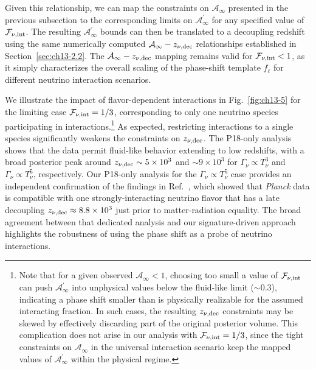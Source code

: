 Given this relationship, we can map the constraints on $\mathcal{A}_{\infty}$ presented in the previous subsection to the corresponding limits on $\mathcal{A}^\prime_{\infty}$ for any specified value of $\mathcal{F}_{\nu,\rm int}$. The resulting $\mathcal{A}^\prime_{\infty}$ bounds can then be translated to a decoupling redshift using the same numerically computed $\mathcal{A}_\infty - z_{\nu,\rm dec}$ relationships established in Section~\ref{sec:ch13-2.2}. The $\mathcal{A}_\infty - z_{\nu,\rm dec}$ mapping remains valid for $\mathcal{F}_{\nu,\rm int} < 1$, as it simply characterizes the overall scaling of the phase-shift template $f_\ell$ for different neutrino interaction scenarios.

We illustrate the impact of flavor-dependent interactions in Fig.~\ref{fig:ch13-5} for the limiting case $\mathcal{F}_{\nu,\rm int} = 1/3$, corresponding to only one neutrino species participating in interactions.\footnote{Note that for a given observed $\mathcal{A}_\infty<1$, choosing too small a value of $\mathcal{F}_{\nu,\rm int}$ can push $\mathcal{A}^\prime_\infty$ into unphysical values below the fluid-like limit ($\sim0.3$), indicating a phase shift smaller than is physically realizable for the assumed interacting fraction. In such cases, the resulting $z_{\nu,\rm dec}$ constraints may be skewed by effectively discarding part of the original posterior volume. This complication does not arise in our analysis with $\mathcal{F}_{\nu,\rm int}=1/3$,  since the tight constraints on $\mathcal{A}_\infty$ in the universal interaction scenario keep the mapped values of $\mathcal{A}^\prime_\infty$ within the physical regime. } As expected, restricting interactions to a single species significantly weakens the constraints on $z_{\nu,\rm dec}$. The P18-only analysis shows that the data permit fluid-like behavior extending to low redshifts, with a broad posterior peak around $z_{\nu,\rm dec} \sim 5\times 10^3$ and $ \sim 9\times 10^3$ for $\Gamma_\nu\propto T_\nu^3$ and $\Gamma_\nu\propto T_\nu^5$, respectively. Our P18-only analysis for the $\Gamma_\nu\propto T_\nu^5$ case provides an independent confirmation of the findings in Ref.~\cite{Das:2020xke}, which showed that \textit{Planck} data is compatible with one strongly-interacting neutrino flavor that has a late decoupling $z_{\nu , \rm dec} \approx 8.8\times 10^3$ just prior to matter-radiation equality. The broad agreement between that dedicated analysis and our signature-driven approach highlights the robustness of using the phase shift as a probe of neutrino interactions.

